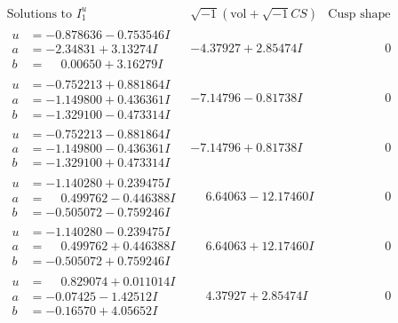\documentclass[1p]{elsarticle_modified}
\theoremstyle{definition}
\newcommand{\I}{\sqrt{-1}}
\begin{document}
$$\begin{array}{c|c|c}
 \end{array}$$\newpage$$\begin{array}{c|c|c}  
\text{Solutions to }I^u_{1}& \I (\text{vol} + \sqrt{-1}CS) & \text{Cusp shape}\\
 \hline 
\begin{aligned}
u &= -0.878636 - 0.753546 I \\
a &= -2.34831 + 3.13274 I \\
b &= \phantom{-}0.00650 + 3.16279 I\end{aligned}
 & -4.37927 + 2.85474 I & \phantom{-0.000000 } 0 \\ \hline\begin{aligned}
u &= -0.752213 + 0.881864 I \\
a &= -1.149800 + 0.436361 I \\
b &= -1.329100 - 0.473314 I\end{aligned}
 & -7.14796 - 0.81738 I & \phantom{-0.000000 } 0 \\ \hline\begin{aligned}
u &= -0.752213 - 0.881864 I \\
a &= -1.149800 - 0.436361 I \\
b &= -1.329100 + 0.473314 I\end{aligned}
 & -7.14796 + 0.81738 I & \phantom{-0.000000 } 0 \\ \hline\begin{aligned}
u &= -1.140280 + 0.239475 I \\
a &= \phantom{-}0.499762 - 0.446388 I \\
b &= -0.505072 - 0.759246 I\end{aligned}
 & \phantom{-}6.64063 - 12.17460 I & \phantom{-0.000000 } 0 \\ \hline\begin{aligned}
u &= -1.140280 - 0.239475 I \\
a &= \phantom{-}0.499762 + 0.446388 I \\
b &= -0.505072 + 0.759246 I\end{aligned}
 & \phantom{-}6.64063 + 12.17460 I & \phantom{-0.000000 } 0 \\ \hline\begin{aligned}
u &= \phantom{-}0.829074 + 0.011014 I \\
a &= -0.07425 - 1.42512 I \\
b &= -0.16570 + 4.05652 I\end{aligned}
 & \phantom{-}4.37927 + 2.85474 I & \phantom{-0.000000 } 0 \\ \hline\begin{aligned}

\end{aligned}
\end{array}$$
\end{document}
